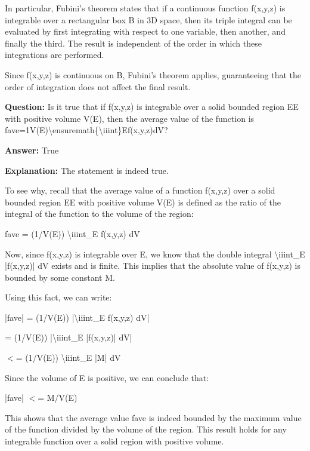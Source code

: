 \documentclass{article}
\begin{document}
In particular, Fubini's theorem states that if a continuous function f(x,y,z) is integrable over a rectangular box B in 3D space, then its triple integral can be evaluated by first integrating with respect to one variable, then another, and finally the third. The result is independent of the order in which these integrations are performed.

Since f(x,y,z) is continuous on B, Fubini's theorem applies, guaranteeing that the order of integration does not affect the final result.
                
                \vspace{0.5cm} 
        
            
        
            
                \textbf {Question:} Is it true that if f(x,y,z) is integrable over a solid bounded region EE with positive volume V(E), then the average value of the function is fave=1V(E){\textbackslash}ensuremath\{{\textbackslash}iiint\}Ef(x,y,z)dV?
                
                \textbf{Answer:} True

                \textbf{Explanation:} The statement is indeed true.

To see why, recall that the average value of a function f(x,y,z) over a solid bounded region EE with positive volume V(E) is defined as the ratio of the integral of the function to the volume of the region:

fave = (1/V(E)) {\textbackslash}iiint\_E f(x,y,z) dV

Now, since f(x,y,z) is integrable over E, we know that the double integral {\textbackslash}iiint\_E |f(x,y,z)| dV exists and is finite. This implies that the absolute value of f(x,y,z) is bounded by some constant M.

Using this fact, we can write:

|fave| = (1/V(E)) |{\textbackslash}iiint\_E f(x,y,z) dV|

= (1/V(E)) |{\textbackslash}iiint\_E |f(x,y,z)| dV|

\ensuremath{<}= (1/V(E)) {\textbackslash}iiint\_E |M| dV

Since the volume of E is positive, we can conclude that:

|fave| \ensuremath{<}= M/V(E)

This shows that the average value fave is indeed bounded by the maximum value of the function divided by the volume of the region. This result holds for any integrable function over a solid region with positive volume.
                
\end{document}
